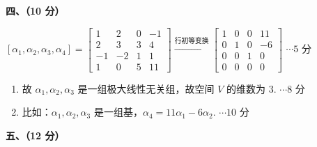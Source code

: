\documentclass[a4paper,11pt]{ctexart}
\newcommand{\score}[1]{\hfill$\cdots\text{#1 分}$}
\begin{document}
\vspace{1.0em}

\textbf{四、（10 分）}

\vspace{0.3em}
$[\alpha_1, \alpha_2, \alpha_3, \alpha_4] = \begin{bmatrix} 1 & 2 & 0 & -1 \\ 2 & 3 & 3 & 4 \\ -1 & -2 & 1 & 1 \\ 1 & 0 & 5 & 11 \end{bmatrix} \xrightarrow{\text{行初等变换}} \begin{bmatrix} 1 & 0 & 0 & 11 \\ 0 & 1 & 0 & -6 \\ 0 & 0 & 1 & 0 \\ 0 & 0 & 0 & 0 \end{bmatrix}$ \score{5}

\vspace{0.3em}
\begin{enumerate}[label=(\arabic*), leftmargin=2.4em, itemsep=0.25em, topsep=0.3em]
  \item 故 $\alpha_1, \alpha_2, \alpha_3$ 是一组极大线性无关组，故空间 $V$ 的维数为 $3$. \score{8}
  \item 比如：$\alpha_1, \alpha_2, \alpha_3$ 是一组基，$\alpha_4 = 11\alpha_1 - 6\alpha_2$. \score{10}
\end{enumerate}

\vspace{1.0em}

\textbf{五、（12 分）}
\end{document}
